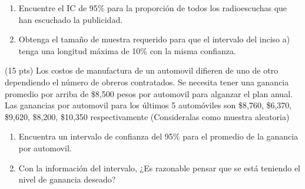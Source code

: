 \documentclass[addpoints]{exam}
\theoremstyle{mytheor}
\begin{document}
\begin{questions}
  
  \begin{enumerate}
  \item Encuentre el IC de 95\% para la proporción de todos los radioescuchas que han escuchado la publicidad.
  
  \item Obtenga el tamaño de muestra requerido para que el intervalo del inciso a) tenga una longitud máxima de 10\% con la misma confianza.
  \end{enumerate}
  
  
  \question (15 pts) Los costos de manufactura de un automovil difieren de uno de otro dependiendo el número de obreros contratados. Se necesita tener una ganancia promedio por arriba de \$8,500 pesos por automovil para alganzar el plan anual. Las ganancias por automovil para los últimos 5 automóviles son \$8,760, \$6,370, \$9,620, \$8,200, \$10,350 respectivamente (Consideralas como muestra aleatoria)
 \begin{enumerate}
 \item Encuentra un intervalo de confianza del 95\% para el promedio de la ganancia por automovil.
 
\item Con la información del intervalo, ¿Es razonable pensar que se está teniendo el nivel de ganancia deseado?

\end{enumerate}
  
  
  
 
 
  \end{questions}
  
\end{document}
